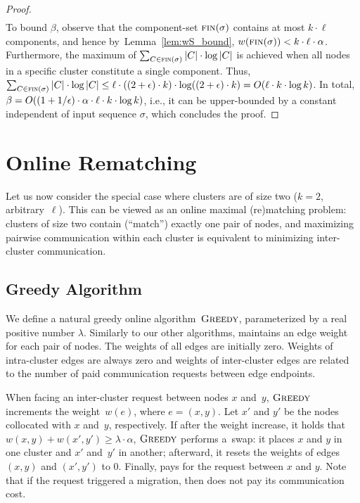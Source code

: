 \begin{proof}
\begin{align*}
\end{align*}
To bound $\beta$, observe that the component-set $\textsc{fin}(\sigma)$
contains at most $k \cdot \ell$ components, and hence
by~Lemma~\ref{lem:wS_bound}, $w(\textsc{fin}(\sigma)) < k \cdot \ell \cdot
\alpha$. Furthermore, the maximum of $\sum_{C \in \textsc{fin}(\sigma)} |C| \cdot
\log |C|$ is achieved when all nodes in a specific cluster constitute a single
component. Thus, $\sum_{C \in \textsc{fin}(\sigma)} |C| \cdot \log |C|
\leq \ell \cdot ((2+\epsilon) \cdot k) \cdot \log ((2+\epsilon) \cdot k) = O(\ell
\cdot k \cdot \log k)$.
In total, $\beta = O((1 + 1/\epsilon) \cdot \alpha \cdot \ell \cdot k \cdot \log k)$, 
i.e., it can be upper-bounded by a constant independent of input sequence $\sigma$,
which concludes the proof.
\end{proof}




\section{Online Rematching}
\label{sec:k-two}

Let us now consider the special case where clusters are of size two ($k=2$,
arbitrary~$\ell$). This can be viewed as an online maximal (re)matching problem:
clusters of size two contain (``match'') exactly one pair of nodes, and
maximizing pairwise communication within each cluster is equivalent to
minimizing inter-cluster communication. 


\subsection{Greedy Algorithm}

We define a natural greedy online algorithm~$\textsc{Greedy}$, parameterized by a real
positive number $\lambda$. Similarly to our other algorithms,
\GREEDY  maintains an edge weight for each pair of nodes. 
The weights of all edges are initially zero. Weights of intra-cluster edges
are always zero and weights of inter-cluster edges are related to the number
of paid communication requests between edge endpoints. 

When facing an inter-cluster request between nodes $x$
and~$y$, $\textsc{Greedy}$ increments the weight~$w(e)$, where $e = (x,y)$. Let $x'$
and $y'$ be the nodes collocated with $x$ and~$y$, respectively. If after the
weight increase, it holds that $w(x,y) + w(x',y') \geq \lambda
\cdot \alpha$, $\textsc{Greedy}$ performs a~swap: it places $x$ and $y$ in one
cluster and $x'$ and~$y'$ in another; afterward, it resets the weights of
edges $(x,y)$ and $(x',y')$ to 0. Finally, \GREEDY pays for the request
between $x$ and $y$. Note that if the request triggered a migration, then
\GREEDY does not pay its communication cost.


